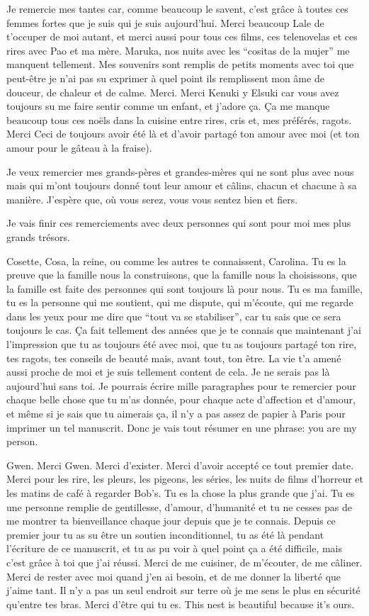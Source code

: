 Je remercie mes tantes car, comme beaucoup le savent, c’est grâce à toutes ces femmes fortes que je suis qui je suis aujourd’hui. Merci beaucoup Lale de t’occuper de moi autant, et merci aussi pour tous ces films, ces telenovelas et ces rires avec Pao et ma mère. Maruka, nos nuits avec les “cositas de la mujer” me manquent tellement. Mes souvenirs sont remplis de petits moments avec toi que peut-être je n’ai pas su exprimer à quel point ils remplissent mon âme de douceur, de chaleur et de calme. Merci. Merci Kenuki y Elsuki car vous avez toujours su me faire sentir comme un enfant, et j’adore ça. Ça me manque beaucoup tous ces noëls dans la cuisine entre rires, cris et, mes préférés, ragots. Merci Ceci de toujours avoir été là et d’avoir partagé ton amour avec moi (et ton amour pour le gâteau à la fraise).

Je veux remercier mes grands-pères et grandes-mères qui ne sont plus avec nous mais qui m’ont toujours donné tout leur amour et câlins, chacun et chacune à sa manière. J’espère que, où vous serez, vous vous sentez bien et fiers.

\vspace{5mm}
Je vais finir ces remerciements avec deux personnes qui sont pour moi mes plus grands trésors.

Cosette, Cosa, la reine, ou comme les autres te connaissent, Carolina. Tu es la preuve que la famille nous la construisons, que la famille nous la choisissons, que la famille est faite des personnes qui sont toujours là pour nous. Tu es ma famille, tu es la personne qui me soutient, qui me dispute, qui m’écoute, qui me regarde dans les yeux pour me dire que “tout va se stabiliser”, car tu sais que ce sera toujours le cas. Ça fait tellement des années que je te connais que maintenant j’ai l’impression que tu as toujours été avec moi, que tu as toujours partagé ton rire, tes ragots, tes conseils de beauté mais, avant tout, ton être. La vie t’a amené aussi proche de moi et je suis tellement content de cela. Je ne serais pas là aujourd’hui sans toi. Je pourrais écrire mille paragraphes pour te remercier pour chaque belle chose que tu m’as donnée, pour chaque acte d’affection et d’amour, et même si je sais que tu aimerais ça, il n’y a pas assez de papier à Paris pour imprimer un tel manuscrit. Donc je vais tout résumer en une phrase: you are my person.

Gwen. Merci Gwen. Merci d’exister. Merci d’avoir accepté ce tout premier date. Merci pour les rire, les pleurs, les pigeons, les séries, les nuits de films d’horreur et les matins de café à regarder Bob’s. Tu es la chose la plus grande que j’ai. Tu es une personne remplie de gentillesse, d’amour, d’humanité et tu ne cesses pas de me montrer ta bienveillance chaque jour depuis que je te connais. Depuis ce premier jour tu as su être un soutien inconditionnel, tu as été là pendant l’écriture de ce manuscrit, et tu as pu voir à quel point ça a été difficile, mais c’est grâce à toi que j’ai réussi. Merci de me cuisiner, de m’écouter, de me câliner. Merci de rester avec moi quand j’en ai besoin, et de me donner la liberté que j’aime tant. Il n’y a pas un seul endroit sur terre où je me sens le plus en sécurité qu'entre tes bras. Merci d’être qui tu es. This nest is beautiful because it’s ours.